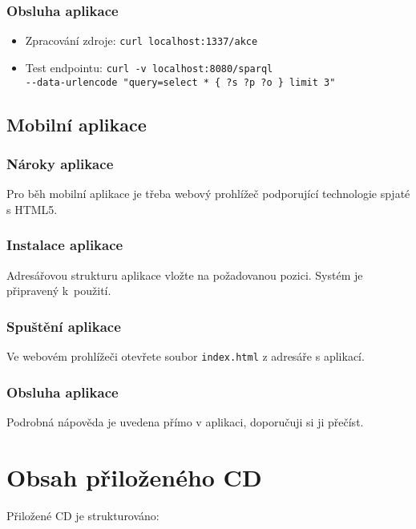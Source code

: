 \subsection{Obsluha aplikace}
\begin{itemize}
 \item Zpracování zdroje: \texttt{curl localhost:1337/akce}
 \item Test  endpointu: \texttt{curl -v localhost:8080/sparql \\ -{}-data-urlencode "query=select * \{ ?s ?p ?o \} limit 3"}
\end{itemize}

\section{Mobilní aplikace}
\subsection{Nároky aplikace}
Pro běh mobilní aplikace je třeba webový prohlížeč podporující technologie spjaté s HTML5.

\subsection{Instalace aplikace}
Adresářovou strukturu aplikace vložte na požadovanou pozici. Systém je připravený k~použití.

\subsection{Spuštění aplikace}
Ve webovém prohlížeči otevřete soubor \texttt{index.html} z adresáře s aplikací.

\subsection{Obsluha aplikace}
Podrobná nápověda je uvedena přímo v aplikaci, doporučuji si ji přečíst.



\chapter{Obsah přiloženého CD}

Přiložené CD je strukturováno:

